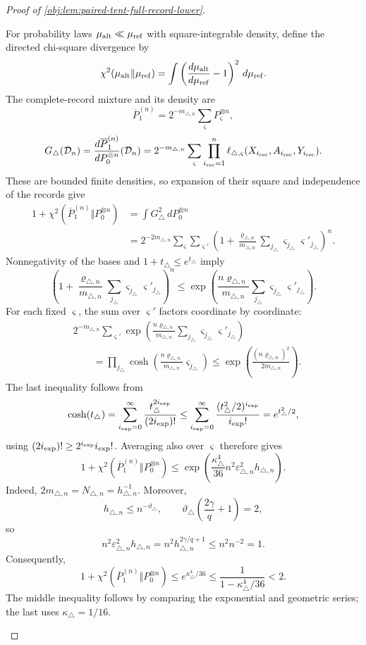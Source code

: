 \begin{proof}[Proof of \cref{obj:lem:paired-tent-full-record-lower}]
\begin{enumerate}
For probability laws \(\mu_{\rm alt}\ll\mu_{\rm ref}\) with square-integrable
density, define the directed chi-square divergence by
\[
\chi^2(\mu_{\rm alt}\Vert\mu_{\rm ref})
=
\int
\left(\frac{d\mu_{\rm alt}}{d\mu_{\rm ref}}-1\right)^2
\,d\mu_{\rm ref}.
\]
The complete-record mixture and its density are
\[
\overline P_1^{(n)}
=
2^{-m_{\triangle,n}}\sum_\varsigma P_\varsigma^{\otimes n},
\]
\[
G_\triangle(\mathcal D_n)
=
\frac{d\overline P_1^{(n)}}{dP_0^{\otimes n}}(\mathcal D_n)
=
2^{-m_{\triangle,n}}\sum_\varsigma
\prod_{i_{\rm rec}=1}^n
\ell_{\triangle,\varsigma}(X_{i_{\rm rec}},A_{i_{\rm rec}},Y_{i_{\rm rec}}).
\]
These are bounded finite densities, so expansion of their square and
independence of the records give
\[
\begin{aligned}
1+\chi^2(\overline P_1^{(n)}\Vert P_0^{\otimes n})
&=\int G_\triangle^2\,dP_0^{\otimes n}\\
&=
2^{-2m_{\triangle,n}}
\sum_\varsigma\sum_{\varsigma'}
\left(
1+\frac{\varrho_{\triangle,n}}{m_{\triangle,n}}
\sum_{j_\triangle}\varsigma_{j_\triangle}\varsigma'_{j_\triangle}
\right)^n.
\end{aligned}
\]
Nonnegativity of the bases and \(1+t_\triangle\le e^{t_\triangle}\) imply
\[
\left(
1+\frac{\varrho_{\triangle,n}}{m_{\triangle,n}}
\sum_{j_\triangle}\varsigma_{j_\triangle}\varsigma'_{j_\triangle}
\right)^n
\le
\exp\left(
\frac{n\varrho_{\triangle,n}}{m_{\triangle,n}}
\sum_{j_\triangle}\varsigma_{j_\triangle}\varsigma'_{j_\triangle}
\right).
\]
For each fixed \(\varsigma\), the sum over \(\varsigma'\) factors coordinate
by coordinate:
\[
\begin{aligned}
&2^{-m_{\triangle,n}}\sum_{\varsigma'}
\exp\left(
\frac{n\varrho_{\triangle,n}}{m_{\triangle,n}}
\sum_{j_\triangle}\varsigma_{j_\triangle}\varsigma'_{j_\triangle}
\right)\\
&\qquad=
\prod_{j_\triangle}
\cosh\left(
\frac{n\varrho_{\triangle,n}}{m_{\triangle,n}}\varsigma_{j_\triangle}
\right)
\le
\exp\left(\frac{(n\varrho_{\triangle,n})^2}{2m_{\triangle,n}}\right).
\end{aligned}
\]
The last inequality follows from
\[
\cosh(t_\triangle)
=
\sum_{i_{\rm exp}=0}^{\infty}
\frac{t_\triangle^{2i_{\rm exp}}}{(2i_{\rm exp})!}
\le
\sum_{i_{\rm exp}=0}^{\infty}
\frac{(t_\triangle^2/2)^{i_{\rm exp}}}{i_{\rm exp}!}
=e^{t_\triangle^2/2},
\]
using \((2i_{\rm exp})!\ge2^{i_{\rm exp}}i_{\rm exp}!\).
Averaging also over \(\varsigma\) therefore gives
\[
1+\chi^2(\overline P_1^{(n)}\Vert P_0^{\otimes n})
\le
\exp\left(
\frac{\kappa_\triangle^4}{36}
n^2\varepsilon_{\triangle,n}^2h_{\triangle,n}
\right).
\]
Indeed, \(2m_{\triangle,n}=N_{\triangle,n}=h_{\triangle,n}^{-1}\).
Moreover,
\[
h_{\triangle,n}\le n^{-\vartheta_\triangle},
\qquad
\vartheta_\triangle\left(\frac{2\gamma}{q}+1\right)=2,
\]
so
\[
n^2\varepsilon_{\triangle,n}^2h_{\triangle,n}
=
n^2h_{\triangle,n}^{2\gamma/q+1}
\le n^2n^{-2}=1.
\]
Consequently,
\[
1+\chi^2(\overline P_1^{(n)}\Vert P_0^{\otimes n})
\le e^{\kappa_\triangle^4/36}
\le\frac1{1-\kappa_\triangle^4/36}<2.
\]
The middle inequality follows by comparing the exponential and geometric
series; the last uses \(\kappa_\triangle=1/16\).


\end{enumerate}
\end{proof}
